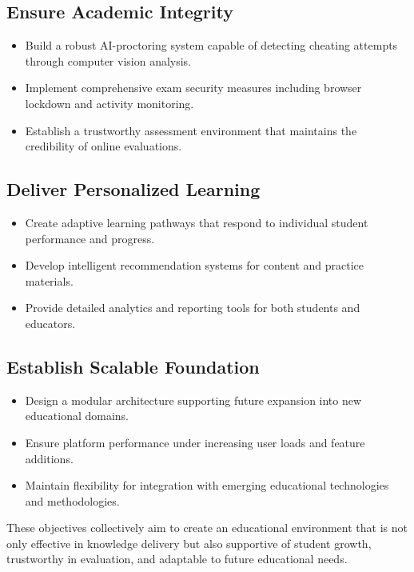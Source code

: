 \subsection{Ensure Academic Integrity}
\label{subsec:ensure_integrity}
\begin{itemize}
    \item Build a robust AI-proctoring system capable of detecting cheating attempts through computer vision analysis.
    \item Implement comprehensive exam security measures including browser lockdown and activity monitoring.
    \item Establish a trustworthy assessment environment that maintains the credibility of online evaluations.
\end{itemize}

\subsection{Deliver Personalized Learning}
\label{subsec:deliver_personalization}
\begin{itemize}
    \item Create adaptive learning pathways that respond to individual student performance and progress.
    \item Develop intelligent recommendation systems for content and practice materials.
    \item Provide detailed analytics and reporting tools for both students and educators.
\end{itemize}

\subsection{Establish Scalable Foundation}
\label{subsec:establish_foundation}
\begin{itemize}
    \item Design a modular architecture supporting future expansion into new educational domains.
    \item Ensure platform performance under increasing user loads and feature additions.
    \item Maintain flexibility for integration with emerging educational technologies and methodologies.
\end{itemize}

These objectives collectively aim to create an educational environment that is not only effective in knowledge delivery but also supportive of student growth, trustworthy in evaluation, and adaptable to future educational needs.